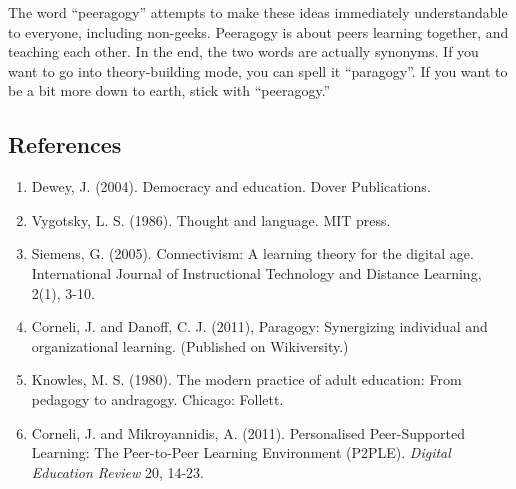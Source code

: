 The word ``peeragogy'' attempts to make these ideas immediately
understandable to everyone, including non-geeks. Peeragogy is about
peers learning together, and teaching each other. In the end, the two
words are actually synonyms. If you want to go into theory-building
mode, you can spell it ``paragogy''. If you want to be a bit more down
to earth, stick with ``peeragogy.''

\subsection{References}

\begin{enumerate}
\item
  Dewey, J. (2004). Democracy and education. Dover Publications.
\item
  Vygotsky, L. S. (1986). Thought and language. MIT press.
\item
  Siemens, G. (2005). Connectivism: A learning theory for the digital
  age. International Journal of Instructional Technology and Distance
  Learning, 2(1), 3-10.
\item
  Corneli, J. and Danoff, C. J. (2011), Paragogy: Synergizing individual
  and organizational learning. (Published on Wikiversity.)
\item
  Knowles, M. S. (1980). The modern practice of adult education: From
  pedagogy to andragogy. Chicago: Follett.
\item
  Corneli, J. and Mikroyannidis, A. (2011). Personalised Peer-Supported
  Learning: The Peer-to-Peer Learning Environment (P2PLE). \emph{Digital
  Education Review} 20, 14-23.
\end{enumerate}
